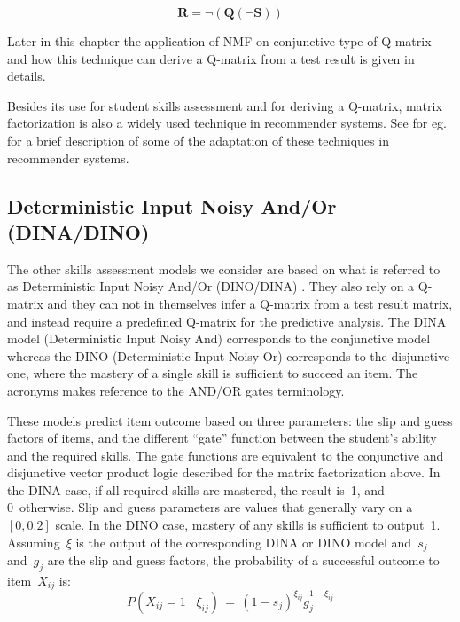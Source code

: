 \begin{equation}
\mathbf{R}=\neg\left(\mathbf{Q}\left(\neg\mathbf{S}\right)\right)\label{eq:6}
\end{equation}

Later in this chapter the application of NMF on conjunctive type of Q-matrix and how this technique can derive a Q-matrix from a test result is given in details.

Besides its use for student skills assessment and for deriving a Q-matrix, matrix factorization is also a widely used technique in recommender systems. See for eg. \citet{koren2009matrix}  for a brief description of some of the adaptation of these techniques in recommender systems. 


\subsection{Deterministic Input Noisy And/Or (DINA/DINO)}
\label{DINA-DINO-Desc}
The other skills assessment models we consider are based on what is referred to as Deterministic Input Noisy And/Or (DINO/DINA) \cite{junker2001cognitive}.  They also rely on a Q-matrix and they can not in themselves infer a Q-matrix from a test result matrix, and instead require a predefined Q-matrix for the predictive analysis. The DINA model (Deterministic Input Noisy And) corresponds to the conjunctive model whereas the DINO (Deterministic Input Noisy Or) corresponds to the disjunctive one, where the mastery of a single skill is sufficient to succeed an item.  The acronyms makes reference to the AND/OR gates terminology.

These models predict item outcome based on three parameters: the slip and guess factors of items, and the different ``gate'' function between the student's ability and the required skills.  The gate functions are equivalent to the conjunctive and disjunctive vector product logic described for the matrix factorization above.  In the DINA case, if all required skills are mastered, the result is~1, and 0~otherwise. Slip and guess parameters are values that generally vary on a~$[0,0.2]$ scale. In the DINO case, mastery of any skills is sufficient to output~1.  Assuming~$\xi$ is the output of the corresponding DINA or DINO model and~$s_j$ and~$g_j$ are the slip and guess factors, the probability of a successful outcome to item~$X_{ij}$ is:
\begin{equation}
 P(X_{ij} \!=\! 1 \; | \; \xi_{ij}) \,=\, (1-s_j)^{\xi_{ij}} g_j^{1-\xi_{ij}}
\label{DinoEQ}
\end{equation}


